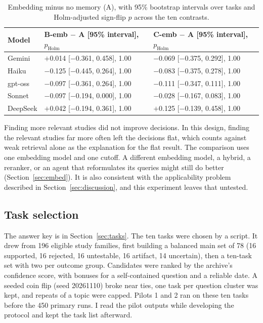 \documentclass[11pt]{article}
\begin{document}
\begin{table}[ht]
\centering
\caption{Embedding minus no memory (A), with 95\% bootstrap intervals over tasks and Holm-adjusted sign-flip $p$ across the ten contrasts.}
\label{tab:embed_diff}
\small
\begin{tabular}{lll}
\toprule
Model & B-emb $-$ A [95\% interval], $p_{\mathrm{Holm}}$ & C-emb $-$ A [95\% interval], $p_{\mathrm{Holm}}$ \\
\midrule
Gemini & $+$0.014 [$-$0.361, 0.458], 1.00 & $-$0.069 [$-$0.375, 0.292], 1.00 \\
Haiku & $-$0.125 [$-$0.445, 0.264], 1.00 & $-$0.083 [$-$0.375, 0.278], 1.00 \\
gpt-oss & $-$0.097 [$-$0.361, 0.264], 1.00 & $-$0.111 [$-$0.347, 0.111], 1.00 \\
Sonnet & $-$0.097 [$-$0.194, 0.000], 1.00 & $-$0.028 [$-$0.167, 0.083], 1.00 \\
DeepSeek & $+$0.042 [$-$0.194, 0.361], 1.00 & $+$0.125 [$-$0.139, 0.458], 1.00 \\
\bottomrule
\end{tabular}
\end{table}

Finding more relevant studies did not improve decisions. In this design, finding the relevant studies far more often left the decisions flat, which counts against weak retrieval alone as the explanation for the flat result. The comparison uses one embedding model and one cutoff. A different embedding model, a hybrid, a reranker, or an agent that reformulates its queries might still do better (Section~\ref{sec:embed}). It is also consistent with the applicability problem described in Section~\ref{sec:discussion}, and this experiment leaves that untested.

\FloatBarrier







\subsection{Task selection}
\label{app:selection}

The answer key is in Section~\ref{sec:tasks}. The ten tasks were chosen by a script. It drew from 196 eligible study families, first building a balanced main set of 78 (16 supported, 16 rejected, 16 untestable, 16 artifact, 14 uncertain), then a ten-task set with two per outcome group. Candidates were ranked by the archive's confidence score, with bonuses for a self-contained question and a reliable date. A seeded coin flip (seed 20261110) broke near ties, one task per question cluster was kept, and repeats of a topic were capped. Pilots 1 and 2 ran on these ten tasks before the 450 primary runs. I read the pilot outputs while developing the protocol and kept the task list afterward.
\end{document}

